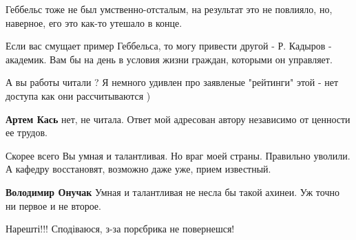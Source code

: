 \begin{itemize}
Геббельс тоже не был умственно-отсталым, на результат это не повлияло, но,
наверное, его это как-то утешало в конце.

Если вас смущает пример Геббельса, то могу привести другой - Р. Кадыров -
академик. Вам бы на день в условия жизни граждан, которыми он управляет.

\begin{itemize}
 
А вы работы читали ? Я немного удивлен про заявленые "рейтинги" этой - нет доступа как они рассчитываются )

 
\textbf{Артем Кась} нет, не читала. Ответ мой адресован автору независимо от ценности ее трудов.
\end{itemize}

 

Скорее всего Вы умная и талантливая. Но враг моей страны. Правильно уволили. А
кафедру восстановят, возможно даже уже, прием известный.

\begin{itemize}
 
\textbf{Володимир Онучак} Умная и талантливая не несла бы такой ахинеи. Уж точно ни первое и не второе.
\end{itemize}

 
Нарешті!!! Сподіваюся, з-за порєбрика не повернешся!


\end{itemize}

